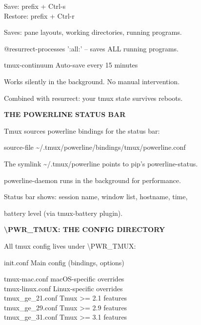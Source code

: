 \documentclass[11pt,a4paper,twoside]{book}
\begin{document}
\begin{codebox}
Save: prefix + Ctrl-s\\
Restore: prefix + Ctrl-r\\
\end{codebox}

Saves: pane layouts, working directories, running programs.

@resurrect-processes ':all:' -- saves ALL running programs.

tmux-continuum    Auto-save every 15 minutes

Works silently in the background. No manual intervention.

Combined with resurrect: your tmux state survives reboots.


\vspace{12pt}
{\bfseries\color{neonyellow} THE POWERLINE STATUS BAR}\vspace{4pt}

Tmux sources powerline bindings for the status bar:

\begin{codebox}
source-file \textasciitilde{}/.tmux/powerline/bindings/tmux/powerline.conf\\
\end{codebox}

The symlink \textasciitilde{}/.tmux/powerline points to pip's powerline-status.

powerline-daemon runs in the background for performance.

Status bar shows: session name, window list, hostname, time,

battery level (via tmux-battery plugin).


\vspace{12pt}
{\bfseries\color{neonyellow} \textbackslash{}PWR\_TMUX: THE CONFIG DIRECTORY}\vspace{4pt}

All tmux config lives under \textbackslash{}PWR\_TMUX:

init.conf               Main config (bindings, options)

\begin{codebox}
tmux-mac.conf           macOS-specific overrides\\
tmux-linux.conf         Linux-specific overrides\\
tmux\_ge\_21.conf         Tmux >= 2.1 features\\
tmux\_ge\_29.conf         Tmux >= 2.9 features\\
tmux\_ge\_31.conf         Tmux >= 3.1 features\\
\end{codebox}
\end{document}
